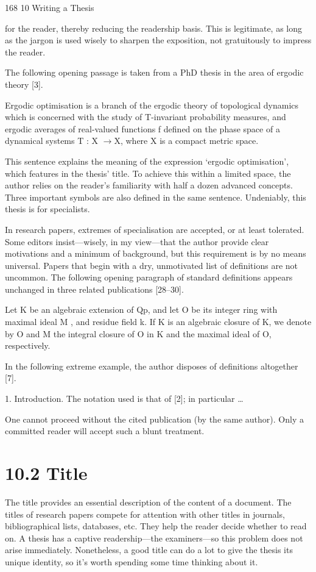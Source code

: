 \documentclass[11pt]{article}
\theoremstyle{plain}
\theoremstyle{definition}
\begin{document}
168 10 Writing a Thesis

for the reader, thereby reducing the readership basis. This is legitimate, as long as the jargon is used wisely to sharpen the exposition, not gratuitously to impress the reader.

The following opening passage is taken from a PhD thesis in the area of ergodic theory [3].

Ergodic optimisation is a branch of the ergodic theory of topological dynamics which is concerned with the study of T-invariant probability measures, and ergodic averages of real-valued functions f defined on the phase space of a dynamical systems T : X $\to$X, where X is a compact metric space.

This sentence explains the meaning of the expression `ergodic optimisation', which features in the thesis' title. To achieve this within a limited space, the author relies on the reader's familiarity with half a dozen advanced concepts. Three important symbols are also defined in the same sentence. Undeniably, this thesis is for specialists.

In research papers, extremes of specialisation are accepted, or at least tolerated. Some editors insist---wisely, in my view---that the author provide clear motivations and a minimum of background, but this requirement is by no means universal. Papers that begin with a dry, unmotivated list of definitions are not uncommon. The following opening paragraph of standard definitions appears unchanged in three related publications [28--30].

Let K be an algebraic extension of Qp, and let O be its integer ring with maximal ideal M , and residue field k. If K is an algebraic closure of K, we denote by O and M the integral closure of O in K and the maximal ideal of O, respectively.

In the following extreme example, the author disposes of definitions altogether [7].

1. Introduction. The notation used is that of [2]; in particular \dots{}

One cannot proceed without the cited publication (by the same author). Only a committed reader will accept such a blunt treatment.

\section{10.2 Title}

The title provides an essential description of the content of a document. The titles of research papers compete for attention with other titles in journals, bibliographical lists, databases, etc. They help the reader decide whether to read on. A thesis has a captive readership---the examiners---so this problem does not arise immediately. Nonetheless, a good title can do a lot to give the thesis its unique identity, so it's worth spending some time thinking about it.
\end{document}

